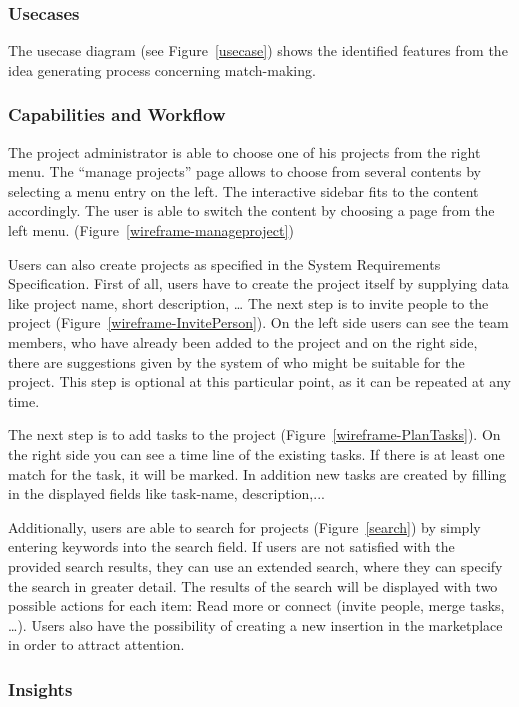 \documentclass[a4paper,oneside,titlepage]{article}
\begin{document}
\subsubsection{Usecases}

The usecase diagram (see Figure~\ref{usecase}) shows the identified features from the idea generating process concerning match-making.

\subsubsection{Capabilities and Workflow}

The project administrator is able to choose one of his projects from the right menu. The ``manage projects'' page allows to choose from several contents by selecting a menu entry on the left. The interactive sidebar fits to the content accordingly. The user is able to switch the content by choosing a page from the left menu. (Figure~\ref{wireframe-manageproject}) 

Users can also create projects as specified in the System Requirements Specification. First of all, users have to create the project itself by supplying data like project name, short description, \dots 
The next step is to invite people to the project (Figure~\ref{wireframe-InvitePerson}). On the left side users can see the team members, who have already been added to the project and on the right side, there are suggestions given by the system of who might be suitable for the project.
This step is optional at this particular point, as it can be repeated at any time.

The next step is to add tasks to the project (Figure~\ref{wireframe-PlanTasks}). On the right side you can see a time line of the existing tasks. 
If there is at least one match for the task, it will be marked. 
In addition new tasks are created by filling in the displayed fields like task-name, description,...

Additionally, users are able to search for projects (Figure~\ref{search}) by simply entering keywords into the search field.
If users are not satisfied with the provided search results, they can use an extended search, where they can specify the search in greater detail. 
The results of the search will be displayed with two possible actions for each item: Read more or connect (invite people, merge tasks, \dots).
Users also have the possibility of creating a new insertion in the marketplace in order to attract attention.


\subsubsection{Insights}
\end{document}
